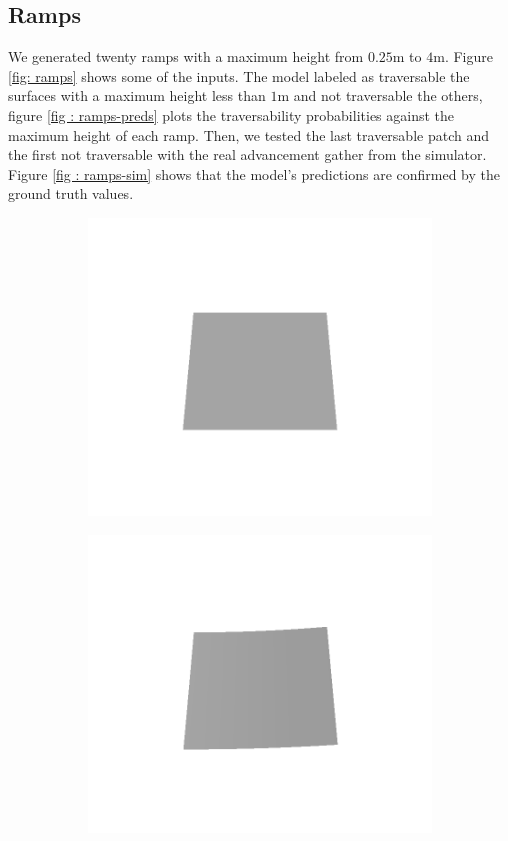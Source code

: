 \subsection{Ramps}
We generated twenty ramps with a maximum height from $0.25$m to $4$m. Figure \ref{fig: ramps} shows some of the inputs. The model labeled as traversable the surfaces with a maximum height less than $1$m and not traversable the others, figure \ref{fig : ramps-preds} plots the traversability probabilities against the maximum height of each ramp. Then, we tested the last traversable patch and the first not traversable with the real advancement gather from the simulator. Figure \ref{fig : ramps-sim} shows that the model's predictions are confirmed by the ground truth values. 
\begin{figure}[htbp]
    \centering
    \begin{subfigure}[b]{0.24\linewidth}
    \includegraphics[width=\linewidth]{../img/5/custom_patches/ramp/all/00-3d.png}
    \end{subfigure}
    \begin{subfigure}[b]{0.24\linewidth}
    \includegraphics[width=\linewidth]{../img/5/custom_patches/ramp/all/03-3d.png}

\end{subfigure}
\end{figure}
